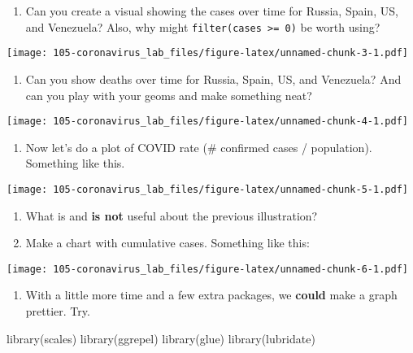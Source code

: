 \documentclass[
]{book}
\newenvironment{Shaded}{\begin{snugshade}}{\end{snugshade}}
\newcommand{\FunctionTok}[1]{\textcolor[rgb]{0.00,0.00,0.00}{#1}}
\newcommand{\NormalTok}[1]{#1}
\providecommand{\tightlist}{%
  \setlength{\itemsep}{0pt}\setlength{\parskip}{0pt}}
\begin{document}
\begin{enumerate}
\def\labelenumi{\arabic{enumi}.}
\tightlist
\item
  Can you create a visual showing the cases over time for Russia, Spain, US, and Venezuela?
  Also, why might \texttt{filter(cases\ \textgreater{}=\ 0)} be worth using?
\end{enumerate}

\texttt{[image: 105-coronavirus\_lab\_files/figure-latex/unnamed-chunk-3-1.pdf]}

\begin{enumerate}
\def\labelenumi{\arabic{enumi}.}
\setcounter{enumi}{1}
\tightlist
\item
  Can you show deaths over time for Russia, Spain, US, and Venezuela? And can you play with your geoms and make something neat?
\end{enumerate}

\texttt{[image: 105-coronavirus\_lab\_files/figure-latex/unnamed-chunk-4-1.pdf]}

\begin{enumerate}
\def\labelenumi{\arabic{enumi}.}
\setcounter{enumi}{2}
\tightlist
\item
  Now let's do a plot of COVID rate (\# confirmed cases / population). Something like this.
\end{enumerate}

\texttt{[image: 105-coronavirus\_lab\_files/figure-latex/unnamed-chunk-5-1.pdf]}

\begin{enumerate}
\def\labelenumi{\arabic{enumi}.}
\setcounter{enumi}{3}
\item
  What is and \textbf{is not} useful about the previous illustration?
\item
  Make a chart with cumulative cases. Something like this:
\end{enumerate}

\texttt{[image: 105-coronavirus\_lab\_files/figure-latex/unnamed-chunk-6-1.pdf]}

\begin{enumerate}
\def\labelenumi{\arabic{enumi}.}
\setcounter{enumi}{5}
\tightlist
\item
  With a little more time and a few extra packages, we \textbf{could} make a graph prettier. Try.
\end{enumerate}

\begin{Shaded}
\begin{Highlighting}[]
\FunctionTok{library}\NormalTok{(scales)}
\FunctionTok{library}\NormalTok{(ggrepel)}
\FunctionTok{library}\NormalTok{(glue)}
\FunctionTok{library}\NormalTok{(lubridate)}
\end{Highlighting}
\end{Shaded}
\end{document}
